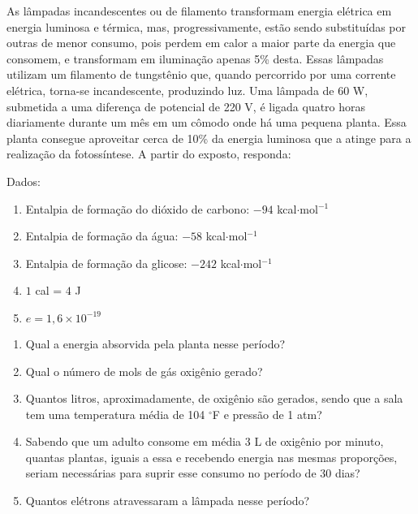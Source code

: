 As lâmpadas incandescentes ou de filamento transformam energia elétrica em energia luminosa e térmica, mas, progressivamente, estão sendo substituídas por outras de menor consumo, pois perdem em calor a maior parte da energia que consomem, e transformam em iluminação apenas 5\% desta.
Essas lâmpadas utilizam um filamento de tungstênio que, quando percorrido por uma corrente elétrica, torna-se incandescente, produzindo luz.
Uma lâmpada de 60 W, submetida a uma diferença de potencial de 220 V, é ligada quatro horas diariamente durante um mês em um cômodo onde há uma pequena planta.
Essa planta consegue aproveitar cerca de 10\% da energia luminosa que a atinge para a realização da fotossíntese.
A partir do exposto, responda:

Dados:
\begin{enumerate}[label = --]
	\item Entalpia de formação do dióxido de carbono: $-94$ kcal$\cdot$mol$^{-1}$ 
	\item Entalpia de formação da água: $-58$ kcal$\cdot$mol$^{-1}$ 
	\item  Entalpia de formação da glicose: $-242$ kcal$\cdot$mol$^{-1}$
	\item $1$ cal = $4$ J
	\item $e = 1,6 \times 10^{-19}$ 
\end{enumerate}

\begin{enumerate}[label = (\alph*)]
	\item Qual a energia absorvida pela planta nesse período? 
	\item Qual o número de mols de gás oxigênio gerado? 
	\item  Quantos litros, aproximadamente, de oxigênio são gerados, sendo que a sala tem uma temperatura média de 104 $^\circ$F e pressão de 1 atm? 
	\item Sabendo que um adulto consome em média 3 L de oxigênio por minuto, quantas plantas, iguais a essa e recebendo energia nas mesmas proporções, seriam necessárias para suprir esse consumo no período de 30 dias? 
	\item Quantos elétrons atravessaram a lâmpada nesse período? 
\end{enumerate}
